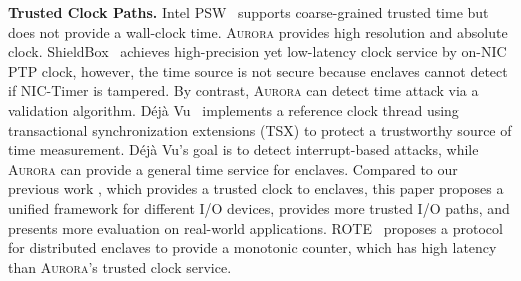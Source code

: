 \textbf{Trusted Clock Paths.} Intel PSW~\cite{intel_psw} supports coarse-grained trusted time but does not provide a wall-clock time. \textsc{Aurora} provides high resolution and absolute clock. ShieldBox~\cite{DBLP:conf/sosr/TrachKGABF18} achieves high-precision yet low-latency clock service by on-NIC PTP clock, however, the time source is not secure because enclaves cannot detect if  NIC-Timer is tampered. By contrast, \textsc{Aurora} can detect time attack via a validation algorithm. Déjà Vu~\cite{DBLP:conf/ccs/ChenZRZ17} implements a reference clock thread using transactional synchronization extensions (TSX) to protect a trustworthy source of time measurement. Déjà Vu's goal is to detect interrupt-based attacks, while \textsc{Aurora} can provide a general time service for enclaves. Compared to our previous work \cite{DBLP:conf/eurosys/LiangL18}, which provides a trusted clock to enclaves, this paper proposes a unified framework for different I/O devices, provides more trusted I/O paths, and presents more evaluation on real-world applications. ROTE~\cite{DBLP:conf/uss/MateticAKDSGJC17} proposes a protocol for distributed enclaves to provide a monotonic counter, which has high latency than \textsc{Aurora}'s trusted clock service.


